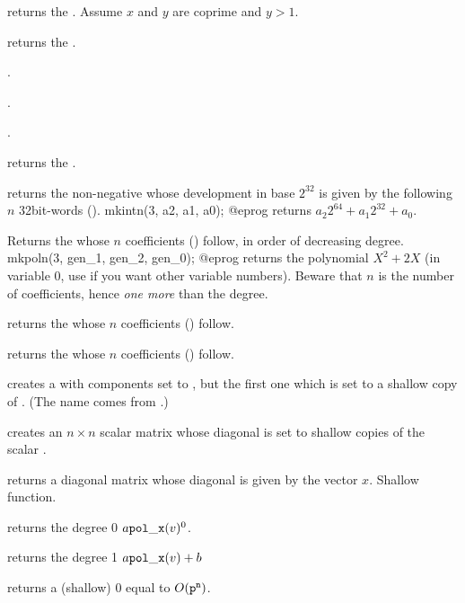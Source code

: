 returns the  . Assume $x$ and $y$ are coprime and $y > 1$.

returns the  .

.

.

.

returns the  .

\smallskip

 returns the non-negative  whose
development in base $2^{32}$ is given by the following $n$ 32bit-words
().
\bprog
  mkintn(3, a2, a1, a0);
@eprog
\noindent returns $a_2 2^{64} + a_1 2^{32} + a_0$.

 Returns the  whose $n$
coefficients () follow, in order of decreasing degree.
\bprog
  mkpoln(3, gen_1, gen_2, gen_0);
@eprog
\noindent returns the polynomial $X^2 + 2X$ (in variable $0$, use
 if you want other variable numbers). Beware that $n$ is the
number of coefficients, hence \emph{one more} than the degree.

 returns the  whose $n$
coefficients () follow.

 returns the  whose $n$
coefficients () follow.

 creates a  with 
components set to , but the first one which is set to a shallow
copy of . (The name comes from .)

 creates an $n\times n$
scalar matrix whose diagonal is set to shallow copies of the scalar .

 returns a diagonal matrix whose diagonal
is given by the vector $x$. Shallow function.

 returns the degree 0
 $a {\tt pol\_x}(v)^0$.

 returns the degree 1
 $a{\tt pol\_x}(v) + b$

 returns a (shallow) $0$
 equal to $O({\tt p}^{\tt n})$.

